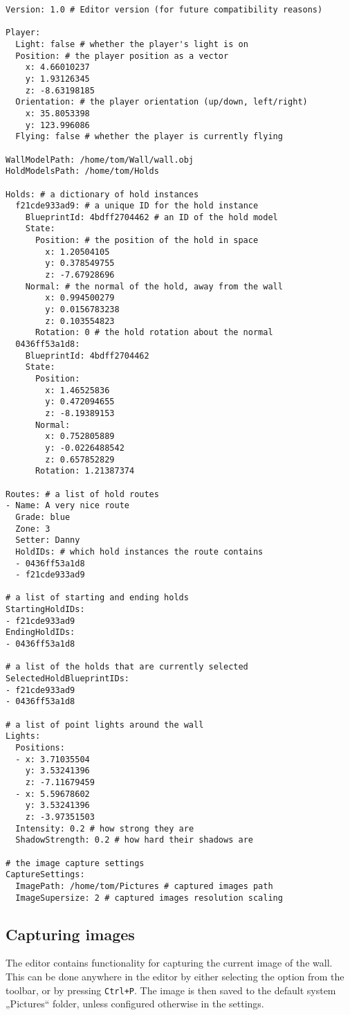 \begin{verbatim}
Version: 1.0 # Editor version (for future compatibility reasons)

Player:
  Light: false # whether the player's light is on
  Position: # the player position as a vector
    x: 4.66010237
    y: 1.93126345
    z: -8.63198185
  Orientation: # the player orientation (up/down, left/right)
    x: 35.8053398
    y: 123.996086
  Flying: false # whether the player is currently flying

WallModelPath: /home/tom/Wall/wall.obj
HoldModelsPath: /home/tom/Holds

Holds: # a dictionary of hold instances
  f21cde933ad9: # a unique ID for the hold instance
    BlueprintId: 4bdff2704462 # an ID of the hold model
    State:
      Position: # the position of the hold in space
        x: 1.20504105
        y: 0.378549755
        z: -7.67928696
    Normal: # the normal of the hold, away from the wall
        x: 0.994500279
        y: 0.0156783238
        z: 0.103554823
      Rotation: 0 # the hold rotation about the normal
  0436ff53a1d8:
    BlueprintId: 4bdff2704462
    State:
      Position:
        x: 1.46525836
        y: 0.472094655
        z: -8.19389153
      Normal:
        x: 0.752805889
        y: -0.0226488542
        z: 0.657852829
      Rotation: 1.21387374

Routes: # a list of hold routes
- Name: A very nice route
  Grade: blue
  Zone: 3
  Setter: Danny
  HoldIDs: # which hold instances the route contains
  - 0436ff53a1d8
  - f21cde933ad9

# a list of starting and ending holds
StartingHoldIDs:
- f21cde933ad9
EndingHoldIDs:
- 0436ff53a1d8

# a list of the holds that are currently selected
SelectedHoldBlueprintIDs:
- f21cde933ad9
- 0436ff53a1d8

# a list of point lights around the wall
Lights:
  Positions:
  - x: 3.71035504
    y: 3.53241396
    z: -7.11679459
  - x: 5.59678602
    y: 3.53241396
    z: -3.97351503
  Intensity: 0.2 # how strong they are
  ShadowStrength: 0.2 # how hard their shadows are

# the image capture settings
CaptureSettings:
  ImagePath: /home/tom/Pictures # captured images path
  ImageSupersize: 2 # captured images resolution scaling
\end{verbatim}

\subsection{Capturing images}
The editor contains functionality for capturing the current image of the wall.
This can be done anywhere in the editor by either selecting the option from the toolbar, or by pressing \verb|Ctrl+P|.
The image is then saved to the default system „Pictures“ folder, unless configured otherwise in the settings.

